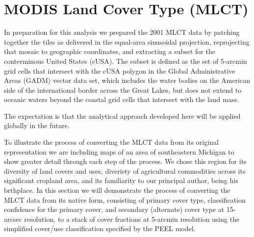 
\section{MODIS Land Cover Type (MLCT)}
\label{sec:mlct}

In preparation for this analysis we prepared the 2001 MLCT data by patching
together the tiles as delivered in the equal-area sinusoidal
projection, reprojecting that mosaic to geographic coordinates, and
extracting a subset for the conterminous United States (cUSA).  The
subset is defined as the set of 5-arcmin grid cells that intersect
with the cUSA polygon in the Global Administrative Areas (GADM) vector
data set, which includes the water bodies on the American side of the
international border across the Great Lakes, but does not extend to
oceanic waters beyond the coastal grid cells that intersect with the
land mass.  

The expectation is that the analytical approach developed here will be
applied globally in the future.

To illustrate the process of converting the MLCT data from its
original representation we are including maps of an area of
southeastern Michigan to show greater detail through each step of the
process.  We chose this region for its diversity of land covers and
uses, diveristy of agricultural commodities across its significant
cropland area, and its familiarity to our principal author, being his
brthplace.  In this section we will demonstrate the process of
converting the MLCT data from its native form, consisting of primary
cover type, classification confidence for the primary cover, and
secondary (alternate) cover type at 15-arcsec resolution, to a stack
of cover fractions at 5-arcmin resolution using the simplified
cover/use classification specified by the PEEL model. 

\begin{Schunk}
\end{Schunk}
